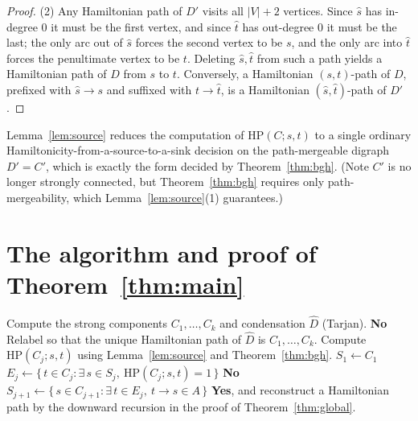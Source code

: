 \documentclass[12pt]{article}
\theoremstyle{definition}
\newcommand{\Vv}{V}
\newcommand{\Aa}{A}
\begin{document}
\begin{proof}
(2) Any Hamiltonian path of $D'$ visits all $|\Vv|+2$ vertices. Since $\hat s$ has
in-degree $0$ it must be the first vertex, and since $\hat t$ has out-degree $0$ it
must be the last; the only arc out of $\hat s$ forces the second vertex to be $s$,
and the only arc into $\hat t$ forces the penultimate vertex to be $t$. Deleting
$\hat s,\hat t$ from such a path yields a Hamiltonian path of $D$ from $s$ to $t$.
Conversely, a Hamiltonian $(s,t)$-path of $D$, prefixed with $\hat s\to s$ and
suffixed with $t\to\hat t$, is a Hamiltonian $(\hat s,\hat t)$-path of $D'$.
\end{proof}

Lemma~\ref{lem:source} reduces the computation of $\mathrm{HP}(C;s,t)$ to a single
ordinary Hamiltonicity-from-a-source-to-a-sink decision on the path-mergeable
digraph $D'=C'$, which is exactly the form decided by Theorem~\ref{thm:bgh}. (Note
$C'$ is no longer strongly connected, but Theorem~\ref{thm:bgh} requires only
path-mergeability, which Lemma~\ref{lem:source}(1) guarantees.)

\section{The algorithm and proof of Theorem~\ref{thm:main}}

\begin{algorithm}[H]
\caption{Hamiltonian path in a path-mergeable digraph}
\begin{algorithmic}[1]
\Require{A path-mergeable digraph $D=(\Vv,\Aa)$, $n=|\Vv|$, $m=|\Aa|$.}
\State Compute the strong components $C_{1},\dots,C_{k}$ and condensation
       $\widehat D$ (Tarjan).
   \State \Return \textbf{No} 
\EndIf
\State Relabel so that the unique Hamiltonian path of $\widehat D$ is
       $C_{1},\dots,C_{k}$.
   \State Compute $\mathrm{HP}(C_{j};s,t)$ using Lemma~\ref{lem:source} and
          Theorem~\ref{thm:bgh}.
\EndFor
\State $S_{1}\gets C_{1}$
   \State $E_{j}\gets\{\,t\in C_{j}: \exists\, s\in S_{j},\ \mathrm{HP}(C_{j};s,t)=1\,\}$
      \State \Return \textbf{No} 
   \EndIf
      \State $S_{j+1}\gets\{\,s\in C_{j+1}: \exists\, t\in E_{j},\ t\to s\in\Aa\,\}$
   \EndIf
\EndFor
\State \Return \textbf{Yes}, and reconstruct a Hamiltonian path by the downward
       recursion in the proof of Theorem~\ref{thm:global}.
\end{algorithmic}
\end{algorithm}
\end{document}
